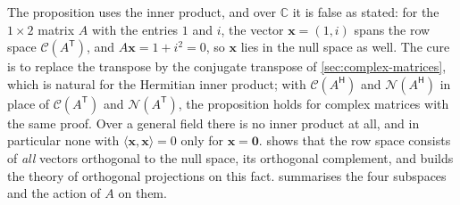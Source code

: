 The proposition uses the inner product, and over $\mathbb C$ it is false as stated: for the $1\times2$ matrix $A$ with the entries $1$ and $i$, the vector $\mathbf x=(1,i)$ spans the row space $\mathcal C(A^{\mathsf T})$, and $A\mathbf x=1+i^2=0$, so $\mathbf x$ lies in the null space as well. The cure is to replace the transpose by the conjugate transpose of \cref{sec:complex-matrices}, which is natural for the Hermitian inner product; with $\mathcal C(A^{\mathsf H})$ and $\mathcal N(A^{\mathsf H})$ in place of $\mathcal C(A^{\mathsf T})$ and $\mathcal N(A^{\mathsf T})$, the proposition holds for complex matrices with the same proof. Over a general field there is no inner product at all, and in particular none with $\langle\mathbf x,\mathbf x\rangle=0$ only for $\mathbf x=\mathbf0$.  shows that the row space consists of \emph{all} vectors orthogonal to the null space, its orthogonal complement, and builds the theory of orthogonal projections on this fact.  summarises the four subspaces and the action of $A$ on them.

